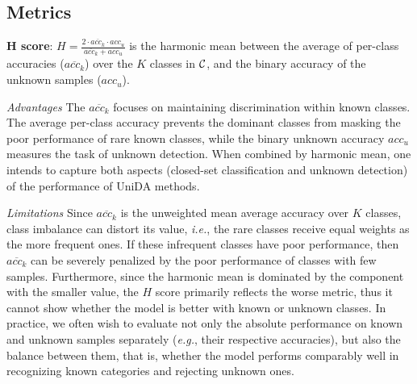 \documentclass[10pt]{article} %
\begin{document}
\subsection{Metrics}
\textbf{$\bm H$ score}: $H = \frac{2 \cdot \overline{acc_k} \cdot acc_u}{\overline{acc_k} + acc_u}$ is the harmonic mean between the average of per-class accuracies ($\overline{acc_k}$) over the $K$ classes in ${\cal C}$, and the binary accuracy of the unknown samples ($acc_u$).
%

%
{\em Advantages} The $\overline{acc_k}$ focuses on maintaining discrimination within known classes.
The average per-class accuracy prevents the dominant classes from masking the poor performance of rare known classes, while the binary unknown accuracy $acc_{u}$ measures the task of unknown detection.
When combined by harmonic mean, one intends to capture both aspects (closed-set classification and unknown detection) of the performance of UniDA methods.

{\em Limitations} Since $\overline{acc_k}$ is the unweighted mean average accuracy over $K$ classes, class imbalance can distort its value, {\em i.e.}, the rare classes receive equal weights as the more frequent ones.
If these infrequent classes have poor performance, then $\overline{acc_k}$ can be severely penalized by the poor performance of classes with few samples.
Furthermore, since the harmonic mean is dominated by the component with the smaller value, the $H$ score primarily reflects the worse metric, thus it cannot show whether the model is better with known or unknown classes.
In practice, we often wish to evaluate not only the absolute performance on known and unknown samples separately ({\em e.g.}, their respective accuracies), but also the balance between them, that is, whether the model performs comparably well in recognizing known categories and rejecting unknown ones.
\end{document}
